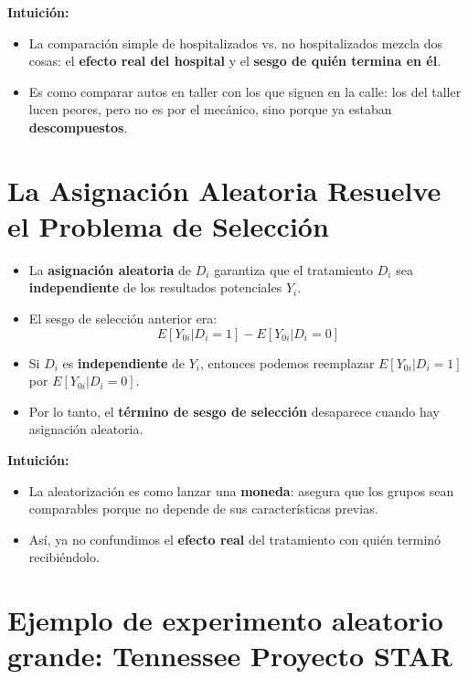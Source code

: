\documentclass[12pt]{article}
\begin{document}
\textbf{Intuición:}
\begin{itemize}
    \item La comparación simple de hospitalizados vs. no hospitalizados mezcla dos cosas: el \textbf{efecto real del hospital} y el \textbf{sesgo de quién termina en él}.
    \item Es como comparar autos en taller con los que siguen en la calle: los del taller lucen peores, pero no es por el mecánico, sino porque ya estaban \textbf{descompuestos}.
\end{itemize}

\section*{\noindent\textbf{La Asignación Aleatoria Resuelve el Problema de Selección}}

\begin{itemize}
    \item La \textbf{asignación aleatoria} de $D_i$ garantiza que el tratamiento $D_i$ sea \textbf{independiente} de los resultados potenciales $Y_i$.
    \item El sesgo de selección anterior era:  
    \[
    E[Y_{0i}|D_i=1] - E[Y_{0i}|D_i=0]
    \]
    \item Si $D_i$ es \textbf{independiente} de $Y_i$, entonces podemos reemplazar $E[Y_{0i}|D_i=1]$ por $E[Y_{0i}|D_i=0]$.
    \item Por lo tanto, el \textbf{término de sesgo de selección} desaparece cuando hay asignación aleatoria.
\end{itemize}

\textbf{Intuición:}
\begin{itemize}
    \item La aleatorización es como lanzar una \textbf{moneda}: asegura que los grupos sean comparables porque no depende de sus características previas.
    \item Así, ya no confundimos el \textbf{efecto real} del tratamiento con quién terminó recibiéndolo.
\end{itemize}


\section*{\noindent\textbf{Ejemplo de experimento aleatorio grande: Tennessee Proyecto STAR}}
\end{document}
